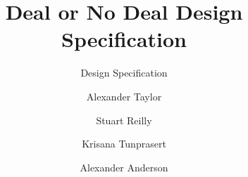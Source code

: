 \documentclass{beamer}
\begin{document}
\title{Deal or No Deal Design Specification}
\subtitle{Design Specification}
\author{Alexander Taylor \and Stuart Reilly \and Krisana Tunprasert \and Alexander Anderson}

\frame{\titlepage}
\end{document}
